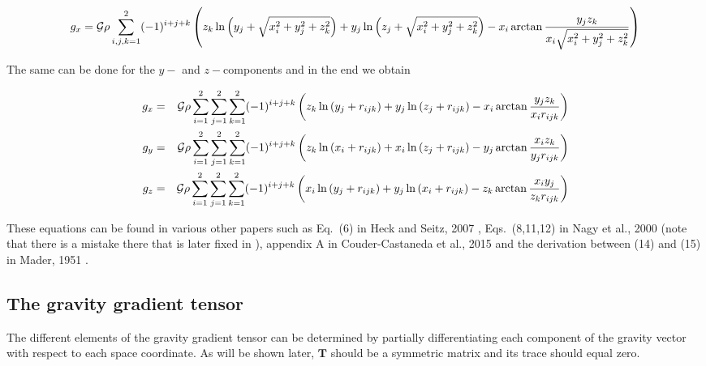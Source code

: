 \begin{eqnarray}
g_x = 
{\cal G}  \rho \sum_{i,j,k=1}^{2} (-1)^{i+j+k}  \left( 
z_k \ln{\left( y_j + \sqrt{x_i^2+y_j^2+z_k^2} \right)} + 
y_j \ln{\left( z_j + \sqrt{x_i^2+y_j^2+z_k^2} \right)} - 
x_i \arctan{\frac{y_j z_k}{x_i \sqrt{x_i^2+y_j^2+z_k^2}}} \right) \nonumber
\end{eqnarray}

The same can be done for the $y-$ and $z-$components and in the end we obtain
\begin{mdframed}[backgroundcolor=blue!5]
\begin{eqnarray}
g_x &=& {\cal G}  \rho \displaystyle\sum_{i=1}^{2} \displaystyle\sum_{j=1}^{2} \displaystyle\sum_{k=1}^{2} (-1)^{i+j+k} 
\left( 
z_k \ln{\left( y_j + r_{ijk} \right)} + 
y_j \ln{\left( z_j + r_{ijk} \right)} - 
x_i \arctan{\frac{y_j z_k}{x_i r_{ijk}}} 
\right) \nonumber\\
g_y &=& 
{\cal G}  \rho \displaystyle\sum_{i=1}^{2} \displaystyle\sum_{j=1}^{2} \displaystyle\sum_{k=1}^{2} (-1)^{i+j+k} 
\left( 
z_k \ln{\left( x_i + r_{ijk} \right)} + 
x_i \ln{\left( z_j + r_{ijk} \right)} - 
y_j \arctan{\frac{x_i z_k}{y_j r_{ijk}}} 
\right) \nonumber\\
g_z &=& 
{\cal G}  \rho \displaystyle\sum_{i=1}^{2} \displaystyle\sum_{j=1}^{2} \displaystyle\sum_{k=1}^{2} (-1)^{i+j+k} 
\left( 
x_i \ln{\left( y_j + r_{ijk} \right)} + 
y_j \ln{\left( x_i + r_{ijk} \right)} - 
z_k \arctan{\frac{x_i y_j}{z_k r_{ijk}}} 
\right) \nonumber
\end{eqnarray}
\end{mdframed}

These equations can be found in various other papers such as Eq.~(6) in Heck and Seitz, 2007 \cite{hese07}, Eqs.~(8,11,12) in Nagy et al., 2000 \cite{napb00} 
(note that there is a mistake there that is later fixed in \cite{napb02}), appendix A in Couder-Castaneda et al., 2015 \cite{cooo15} 
and the derivation between (14) and (15) in Mader, 1951 \cite{made51}.

\subsection{The gravity gradient tensor} %

The different elements of the gravity gradient tensor can be determined by partially differentiating each component of the 
gravity vector with respect to each space coordinate. As will be shown later, ${\bm T}$ should be a symmetric matrix and its trace should equal zero.


